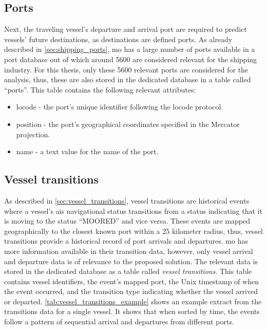 \subsection{Ports}

Next, the traveling vessel's departure and arrival port are required to predict vessels' future destinations, as destinations are defined ports. As already described in \cref{sec:shipping_ports}, \acrshort{mo} has a large number of ports available in a port database out of which around 5600 are considered relevant for the shipping industry. For this thesis, only these 5600 relevant ports are considered for the analysis, thus, these are also stored in the dedicated database in a table called ``ports''. This table contains the following relevant attributes:

\begin{itemize}
    \item locode - the port's unique identifier following the \gls{locode} protocol.
    \item position - the port's geographical coordinates specified in the Mercator projection.
    \item name - a text value for the name of the port.
\end{itemize}

\subsection{Vessel transitions}

As described in \cref{sec:vessel_transitions}, vessel transitions are historical events where a vessel's \acrshort{ais} navigational status transitions from a status indicating that it is moving to the status ``MOORED'' and vice versa. These events are mapped geographically to the closest known port within a 25 kilometer radius, thus, vessel transitions provide a historical record of port arrivals and departures. \acrshort{mo} has more information available in their transition data, however, only vessel arrival and departure data is of relevance to the proposed solution. The relevant data is stored in the dedicated database as a table called \textit{vessel transitions}. This table contains vessel identifiers, the event's mapped port, the Unix timestamp of when the event occurred, and the transition type indicating whether the vessel arrived or departed. \cref{tab:vessel_transitions_example} shows an example extract from the transitions data for a single vessel. It shows that when sorted by time, the events follow a pattern of sequential arrival and departures from different ports.

